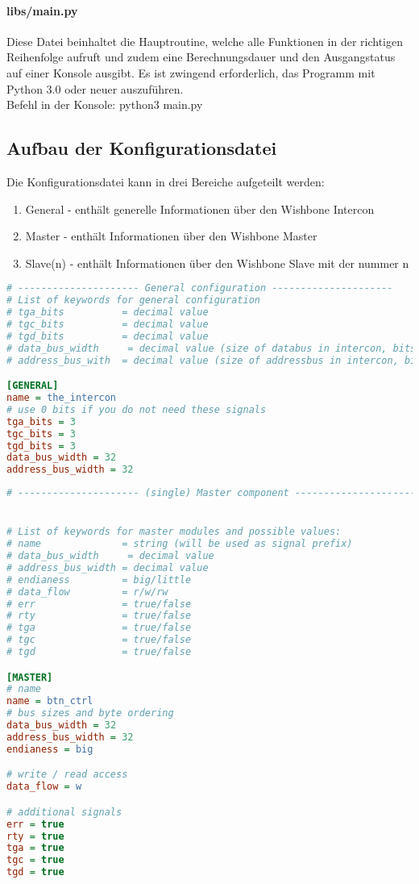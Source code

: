 \documentclass{article}
\newcommand{\nl}{\leavevmode\newline}
\begin{document}
\paragraph{libs/main.py} \nl
Diese Datei beinhaltet die Hauptroutine, welche alle Funktionen in der richtigen Reihenfolge aufruft und zudem eine Berechnungsdauer und den Ausgangstatus auf einer Konsole ausgibt. Es ist zwingend erforderlich, das Programm mit Python 3.0 oder neuer auszuführen.\\
Befehl in der Konsole: python3 main.py
\subsection{Aufbau der Konfigurationsdatei}
Die Konfigurationsdatei kann in drei Bereiche aufgeteilt werden:
\begin{enumerate}
\item General - enthält generelle Informationen über den Wishbone Intercon
\item Master - enthält Informationen über den Wishbone Master
\item Slave(n) - enthält Informationen über den Wishbone Slave mit der nummer \glqq n\grqq
\end{enumerate}
\begin{lstlisting}[language={Ini},frame=single]
# --------------------- General configuration ---------------------
# List of keywords for general configuration
# tga_bits          = decimal value
# tgc_bits          = decimal value
# tgd_bits          = decimal value
# data_bus_width     = decimal value (size of databus in intercon, bits)
# address_bus_with  = decimal value (size of addressbus in intercon, bits)

[GENERAL]
name = the_intercon
# use 0 bits if you do not need these signals
tga_bits = 3
tgc_bits = 3
tgd_bits = 3
data_bus_width = 32
address_bus_width = 32
\end{lstlisting}
\begin{lstlisting}[language={Ini},frame=single]
# --------------------- (single) Master component ---------------------


# List of keywords for master modules and possible values:
# name              = string (will be used as signal prefix)
# data_bus_width     = decimal value
# address_bus_width = decimal value
# endianess         = big/little
# data_flow         = r/w/rw
# err               = true/false
# rty               = true/false
# tga               = true/false
# tgc               = true/false
# tgd               = true/false

[MASTER]
# name
name = btn_ctrl
# bus sizes and byte ordering
data_bus_width = 32
address_bus_width = 32
endianess = big

# write / read access
data_flow = w

# additional signals
err = true
rty = true
tga = true
tgc = true
tgd = true
\end{lstlisting}
\end{document}
